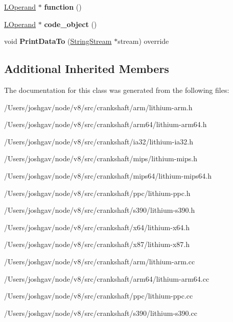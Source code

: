 \begin{DoxyCompactItemize}
\item 
\hyperlink{classv8_1_1internal_1_1_l_operand}{L\+Operand} $\ast$ {\bfseries function} ()\hypertarget{classv8_1_1internal_1_1_l_store_code_entry_a864f2ea5e3b25989bb3366d09c523843}{}\label{classv8_1_1internal_1_1_l_store_code_entry_a864f2ea5e3b25989bb3366d09c523843}

\item 
\hyperlink{classv8_1_1internal_1_1_l_operand}{L\+Operand} $\ast$ {\bfseries code\+\_\+object} ()\hypertarget{classv8_1_1internal_1_1_l_store_code_entry_a59ea37ff8315982d7ff3a2b177c70e07}{}\label{classv8_1_1internal_1_1_l_store_code_entry_a59ea37ff8315982d7ff3a2b177c70e07}

\item 
void {\bfseries Print\+Data\+To} (\hyperlink{classv8_1_1internal_1_1_string_stream}{String\+Stream} $\ast$stream) override\hypertarget{classv8_1_1internal_1_1_l_store_code_entry_a8fad8edaa1b22ad4a43d20eb1c01ec87}{}\label{classv8_1_1internal_1_1_l_store_code_entry_a8fad8edaa1b22ad4a43d20eb1c01ec87}

\end{DoxyCompactItemize}
\subsection*{Additional Inherited Members}


The documentation for this class was generated from the following files\+:\begin{DoxyCompactItemize}
\item 
/\+Users/joshgav/node/v8/src/crankshaft/arm/lithium-\/arm.\+h\item 
/\+Users/joshgav/node/v8/src/crankshaft/arm64/lithium-\/arm64.\+h\item 
/\+Users/joshgav/node/v8/src/crankshaft/ia32/lithium-\/ia32.\+h\item 
/\+Users/joshgav/node/v8/src/crankshaft/mips/lithium-\/mips.\+h\item 
/\+Users/joshgav/node/v8/src/crankshaft/mips64/lithium-\/mips64.\+h\item 
/\+Users/joshgav/node/v8/src/crankshaft/ppc/lithium-\/ppc.\+h\item 
/\+Users/joshgav/node/v8/src/crankshaft/s390/lithium-\/s390.\+h\item 
/\+Users/joshgav/node/v8/src/crankshaft/x64/lithium-\/x64.\+h\item 
/\+Users/joshgav/node/v8/src/crankshaft/x87/lithium-\/x87.\+h\item 
/\+Users/joshgav/node/v8/src/crankshaft/arm/lithium-\/arm.\+cc\item 
/\+Users/joshgav/node/v8/src/crankshaft/arm64/lithium-\/arm64.\+cc\item 
/\+Users/joshgav/node/v8/src/crankshaft/ppc/lithium-\/ppc.\+cc\item 
/\+Users/joshgav/node/v8/src/crankshaft/s390/lithium-\/s390.\+cc\end{DoxyCompactItemize}
